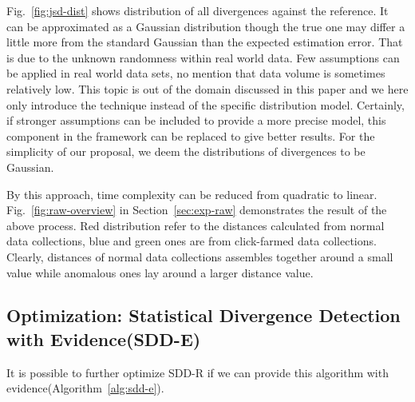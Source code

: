 \documentclass[10pt,conference,letterpaper]{article}
\begin{document}
			Fig.~\ref{fig:jsd-dist} shows distribution of all divergences against the reference. It can be approximated as a Gaussian distribution though the true one may differ a little more from the standard Gaussian than the expected estimation error. That is due to the unknown randomness within real world data. Few assumptions can be applied in real world data sets, no mention that data volume is sometimes relatively low. This topic is out of the domain discussed in this paper and we here only introduce the technique instead of the specific distribution model. 
			Certainly, if stronger assumptions can be included to provide a more precise model, this component in the framework can be replaced to give better results.
			For the simplicity of our proposal, we deem the distributions of divergences to be Gaussian.
			
			By this approach, time complexity can be reduced from quadratic to linear. Fig.~\ref{fig:raw-overview} in Section~\ref{sec:exp-raw} demonstrates the result of the above process. Red distribution refer to the distances calculated from normal data collections, blue and green ones are from click-farmed data collections. Clearly, distances of normal data collections assembles together around a small value while anomalous ones lay around a larger distance value.
			
		\subsection{Optimization: Statistical Divergence Detection with Evidence(SDD-E)}
			It is possible to further optimize SDD-R if we can provide this algorithm with evidence(Algorithm~\ref{alg:sdd-e}).
			
\end{document}
